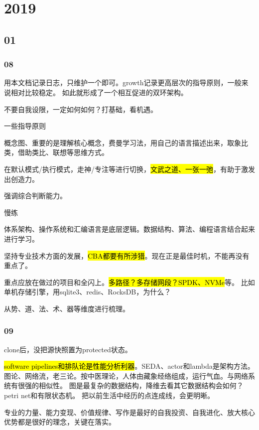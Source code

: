 \chapter{2019}

\section{01}

\subsection{08}

用本文档记录日志，只维护一个即可。growth记录更高层次的指导原则，一般来说相对比较稳定。
如此就形成了一个相互促进的双环架构。

不要自我设限，一定如何如何？打基础，看机遇。

一些指导原则
\begin{enumbox}
\item 概念图、重要的是理解核心概念，费曼学习法，用自己的语言描述出来，取象比类，借助类比、联想等思维方式。
\item 在默认模式/执行模式，走神/专注等进行切换，\hl{文武之道、一张一弛}，有助于激发出创造力。
\item 强调综合判断能力。
\item 慢练
\end{enumbox}

体系架构、操作系统和汇编语言是底层逻辑。数据结构、算法、编程语言结合起来进行学习。

坚持专业技术方面的发展，\hl{CBA都要有所涉猎}。现在正是最佳时机，不能再没有重点了。

重点应放在做过的项目和全闪上。\hl{多路径？多存储网段？SPDK、NVMe}等。
比如单机存储引擎，用sqlite3、redis、RocksDB，为什么？

从势、道、法、术、器等维度进行梳理。

\subsection{09}

clone后，没把源快照置为protected状态。

\hl{software pipelines和排队论是性能分析利器}。SEDA、actor和lambda是架构方法。
图论、网络流，老三论。按中医理论，人体由藏象经络组成，运行气血。与网络系统有很强的相似性。
图是最复杂的数据结构，降维去看其它数据结构会如何？petri net和有限状态机。
把以前生活中经历的点连成线，会更明晰。

专业的力量、能力变现、价值规律、写作是最好的自我投资、自我进化、放大核心优势都是很好的理念，关键在落实。

